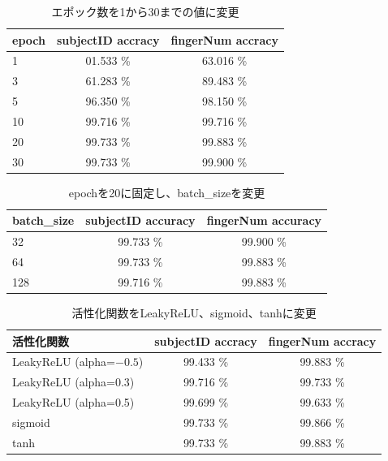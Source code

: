 \documentclass[a4paper, 11pt, titlepage]{jsarticle}
\begin{document}
\begin{table}[htb]
\begin{center}
\caption{エポック数を1から30までの値に変更}
  \begin{tabular}{|l|c|c|}
    \hline
    epoch & subjectID accracy & fingerNum accracy \\ \hline
    1 & 01.533 \% & 63.016 \%  \\ \hline
    3 & 61.283 \% & 89.483 \% \\ \hline
    5 & 96.350 \% & 98.150 \%  \\ \hline
    10 & 99.716 \% & 99.716 \%  \\ \hline
    20 & 99.733 \% & 99.883 \%  \\ \hline
    30 & 99.733 \% & 99.900 \% \\ \hline
  \end{tabular}
  \label{change:epoch}
 \end{center}
\end{table}

\begin{table}[htb]
\begin{center}
\caption{epochを20に固定し、batch\_sizeを変更}
  \begin{tabular}{|l|c|c|}
    \hline
    batch\_size & subjectID accuracy & fingerNum accuracy  \\ \hline
    32 & 99.733 \% & 99.900 \% \\ \hline
    64 & 99.733 \% & 99.883 \% \\ \hline
    128 & 99.716 \% & 99.883 \% \\ \hline
  \end{tabular}
    \label{change:batch}
\end{center}
\end{table}

\begin{table}[htb]
\begin{center}
\caption{活性化関数をLeakyReLU、sigmoid、tanhに変更}
  \begin{tabular}{|l|c|c|}
    \hline
    活性化関数 & subjectID accracy & fingerNum accracy \\ \hline
    LeakyReLU (alpha=$-0.5$) & 99.433 \% & 99.883 \% \\ \hline
    LeakyReLU (alpha=0.3) & 99.716 \% & 99.733 \% \\ \hline
    LeakyReLU (alpha=0.5) & 99.699 \% & 99.633 \% \\ \hline
    sigmoid & 99.733 \% & 99.866 \% \\ \hline
    tanh & 99.733 \% & 99.883 \% \\ \hline
  \end{tabular}
    \label{change:activation}
 \end{center}
\end{table}
\end{document}
